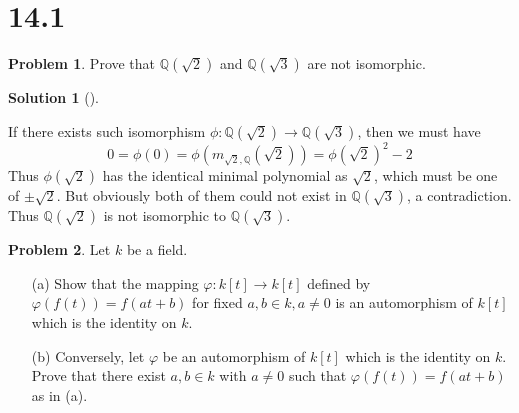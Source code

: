 \documentclass{article}
\theoremstyle{definition}
\newtheorem{prob}{Problem}
\newtheorem*{sol}{Solution}
\newenvironment{sols}[1][]{%
  \begin{sol}[#1]$ $\par\nobreak\ignorespaces
}{%
  \end{sol}
}
\begin{document}
\section*{14.1}

\setcounter{prob}{3}
\begin{prob}
	Prove that $\mathbb{Q}(\sqrt{2})$ and $\mathbb{Q}(\sqrt{3})$ are not isomorphic.
\end{prob}

\begin{sols}
	If there exists such isomorphism $\phi: \mathbb{Q}(\sqrt{2}) \to \mathbb{Q}(\sqrt{3})$, then we must have
	\[
		0 = \phi(0) = \phi(m_{\sqrt{2}, \mathbb{Q}}(\sqrt{2})) = \phi(\sqrt{2})^2 - 2 
	\]
	Thus $\phi(\sqrt{2})$ has the identical minimal polynomial as $\sqrt{2}$, which must be one of $\pm \sqrt{2}$.
	But obviously both of them could not exist in $\mathbb{Q}(\sqrt{3})$, a contradiction. 
	Thus $\mathbb{Q}(\sqrt{2})$ is not isomorphic to $\mathbb{Q}(\sqrt{3})$.
\end{sols}

\setcounter{prob}{5}
\begin{prob}
	Let $k$ be a field.
	\begin{enumerate}
		\item[(a)] Show that the mapping $\varphi: k[t] \to k[t]$ defined by $\varphi(f(t)) = f(at + b)$ for fixed $a, b \in k, a \neq 0$ is an automorphism of $k[t]$ which is the identity on $k$.
		
		\item[(b)] Conversely, let $\varphi$ be an automorphism of $k[t]$ which is the identity on $k$.
			Prove that there exist $a, b \in k$ with $a \neq 0$ such that $\varphi(f(t)) = f(at + b)$ as in (a).
	\end{enumerate}
\end{prob}
\end{document}
